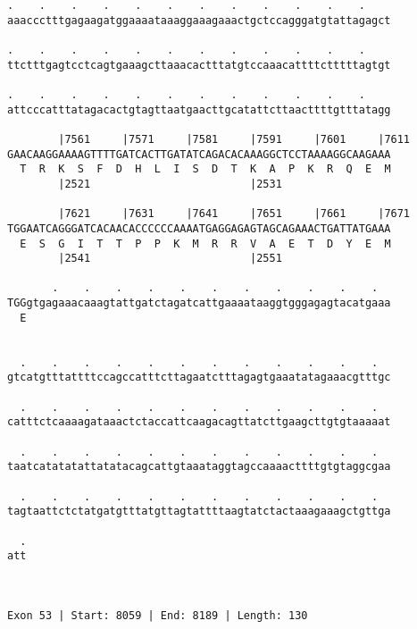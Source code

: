 \documentclass{article}
\begin{document}
\begin{Verbatim}
.    .    .    .    .    .    .    .    .    .    .    .    
aaaccctttgagaagatggaaaataaaggaaagaaactgctccagggatgtattagagct
                                                            
.    .    .    .    .    .    .    .    .    .    .    .    
ttctttgagtcctcagtgaaagcttaaacactttatgtccaaacattttctttttagtgt
                                                            
.    .    .    .    .    .    .    .    .    .    .    .    
attcccatttatagacactgtagttaatgaacttgcatattcttaacttttgtttatagg
                                                            
        |7561     |7571     |7581     |7591     |7601     |7611
GAACAAGGAAAAGTTTTGATCACTTGATATCAGACACAAAGGCTCCTAAAAGGCAAGAAA
  T  R  K  S  F  D  H  L  I  S  D  T  K  A  P  K  R  Q  E  M
        |2521                         |2531                 
  
        |7621     |7631     |7641     |7651     |7661     |7671
TGGAATCAGGGATCACAACACCCCCCAAAATGAGGAGAGTAGCAGAAACTGATTATGAAA
  E  S  G  I  T  T  P  P  K  M  R  R  V  A  E  T  D  Y  E  M
        |2541                         |2551                 
  
       .    .    .    .    .    .    .    .    .    .    .  
TGGgtgagaaacaaagtattgatctagatcattgaaaataaggtgggagagtacatgaaa
  E                                                         
                                                            
  
  .    .    .    .    .    .    .    .    .    .    .    .  
gtcatgtttattttccagccatttcttagaatctttagagtgaaatatagaaacgtttgc
                                                            
  .    .    .    .    .    .    .    .    .    .    .    .  
catttctcaaaagataaactctaccattcaagacagttatcttgaagcttgtgtaaaaat
                                                            
  .    .    .    .    .    .    .    .    .    .    .    .  
taatcatatatattatatacagcattgtaaataggtagccaaaacttttgtgtaggcgaa
                                                            
  .    .    .    .    .    .    .    .    .    .    .    .  
tagtaattctctatgatgtttatgttagtattttaagtatctactaaagaaagctgttga
                                                            
  .
att
   
   
 
Exon 53 | Start: 8059 | End: 8189 | Length: 130




\end{Verbatim}
\end{document}
